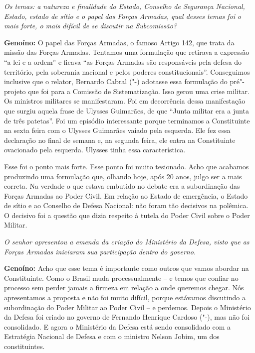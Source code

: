 \emph{Os temas: a natureza e finalidade do Estado, Conselho de
Segurança Nacional, Estado, estado de sítio e o papel das Forças
Armadas, qual desses temas foi o mais forte, o mais difícil de se
discutir na Subcomissão?}

\textbf{Genoíno:} O papel das Forças Armadas, o famoso Artigo 142, que
trata da missão das Forças Armadas. Tentamos uma formulação que retirava
a expressão ``a lei e a ordem'' e ficava ``as Forças Armadas são
responsáveis pela defesa do território, pela soberania nacional e pelos
poderes constitucionais''. Conseguimos inclusive que o relator, Bernardo
Cabral ("-) adotasse essa formulação do pré"-projeto que foi para a
Comissão de Sistematização. Isso gerou uma crise militar. Os ministros
militares se manifestaram. Foi em decorrência dessa manifestação que
surgiu aquela frase de Ulysses Guimarães, de que ``Junta militar era a
junta de três patetas''. Foi um episódio interessante porque terminamos
a Constituinte na sexta feira com o Ulysses Guimarães vaiado pela
esquerda. Ele fez essa declaração no final de semana e, na segunda
feira, ele entra na Constituinte ovacionado pela esquerda. Ulysses tinha
essa característica.

Esse foi o ponto mais forte. Esse ponto foi muito tesionado. Acho que
acabamos produzindo uma formulação que, olhando hoje, após 20 anos,
julgo ser a mais correta. Na verdade o que estava embutido no debate era
a subordinação das Forças Armadas ao Poder Civil. Em relação ao Estado
de emergência, o Estado de sítio e ao Conselho de Defesa Nacional: não
foram tão decisivos na polêmica. O decisivo foi a questão que dizia
respeito à tutela do Poder Civil sobre o Poder Militar.

\emph{O senhor apresentou a emenda da criação do Ministério da Defesa,
visto que as Forças Armadas iniciaram sua participação dentro do
governo.}

\textbf{Genoíno:} Acho que esse tema é importante como outros que vamos
abordar na Constituinte. Como o Brasil muda processualmente -- e temos
que confiar no processo sem perder jamais a firmeza em relação a onde
queremos chegar. Nós apresentamos a proposta e não foi muito difícil,
porque estávamos discutindo a subordinação do Poder Militar ao Poder
Civil -- e perdemos. Depois o Ministério da Defesa foi criado no governo
de Fernando Henrique Cardoso ("-), mas não foi consolidado. E agora
o Ministério da Defesa está sendo consolidado com a Estratégia Nacional
de Defesa e com o ministro Nelson Jobim, um dos constituintes.

